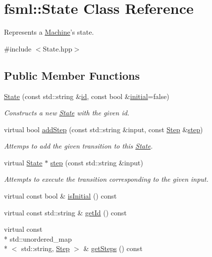 \hypertarget{classfsml_1_1State}{\section{fsml\-:\-:State Class Reference}
\label{classfsml_1_1State}
}


Represents a \hyperlink{classfsml_1_1Machine}{Machine}'s state.  




{\ttfamily \#include $<$State.\-hpp$>$}

\subsection*{Public Member Functions}
\begin{DoxyCompactItemize}
\item 
\hyperlink{classfsml_1_1State_a22711ba81bad4eb0b4a98b17a45cfd36}{State} (const std\-::string \&\hyperlink{classfsml_1_1State_a4acc37de347d0e4a66d6470a4d6ebcf7}{id}, const bool \&\hyperlink{classfsml_1_1State_aeb0c3fe997b186b77e3c363709a1bfea}{initial}=false)
\begin{DoxyCompactList}\small\item\em Constructs a new \hyperlink{classfsml_1_1State}{State} with the given id. \end{DoxyCompactList}\item 
virtual bool \hyperlink{classfsml_1_1State_a0a28f6f4a995313d9bc85d1fdf51fb9b}{add\-Step} (const std\-::string \&input, const \hyperlink{classfsml_1_1Step}{Step} \&\hyperlink{classfsml_1_1State_a0c7aafd6216a785c159e70f00a12d3f8}{step})
\begin{DoxyCompactList}\small\item\em Attemps to add the given transition to this \hyperlink{classfsml_1_1State}{State}. \end{DoxyCompactList}\item 
virtual \hyperlink{classfsml_1_1State}{State} $\ast$ \hyperlink{classfsml_1_1State_a0c7aafd6216a785c159e70f00a12d3f8}{step} (const std\-::string \&input)
\begin{DoxyCompactList}\small\item\em Attempts to execute the transition corresponding to the given input. \end{DoxyCompactList}\item 
virtual const bool \& \hyperlink{classfsml_1_1State_a2cbbbb658b8d6da4b6b0f0a4e97fed7b}{is\-Initial} () const 
\item 
virtual const std\-::string \& \hyperlink{classfsml_1_1State_af13128f0b9cdf6433f4307bb16159477}{get\-Id} () const 
\item 
virtual const \\*
std\-::unordered\-\_\-map\\*
$<$ std\-::string, \hyperlink{classfsml_1_1Step}{Step} $>$ \& \hyperlink{classfsml_1_1State_ad96fe3074f0c3d8bd3dcb9a7cd7e25ed}{get\-Steps} () const 
\end{DoxyCompactItemize}

